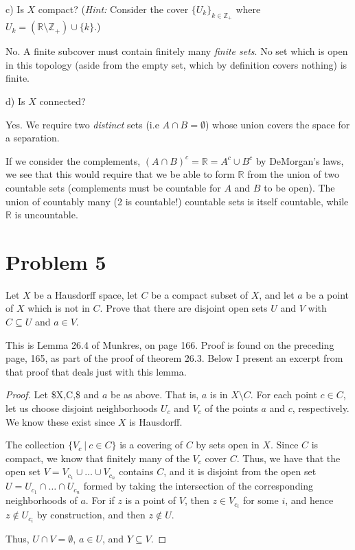 \documentclass[11pt]{article}
\begin{document}
c) Is \(X\) compact? (\textit{Hint:} Consider the cover
\(\{U_k\}_{k\in\mathbb{Z}_+}\) where \(U_k =
(\mathbb{R}\setminus\mathbb{Z}_+)\cup\{k\}\).)

No. A finite subcover must contain finitely many \textit{finite sets}. No set
which is open in this topology (aside from the empty set, which by definition
covers nothing) is finite.

d) Is \(X\) connected? 

Yes. We require two \textit{distinct} sets (i.e \(A\cap B = \emptyset\)) whose
union covers the space for a separation. 

If we consider the complements, \((A\cap B)^c = \mathbb{R} = A^c\cup B^c\) by
DeMorgan's laws, we see that this would require that we be able to form
\(\mathbb{R}\) from the union of two countable sets (complements must be countable
for \(A\) and \(B\) to be open). The union of countably many (2 is countable!)
countable sets is itself countable, while \(\mathbb{R}\) is uncountable.


\section{Problem 5}
\label{sec:org4670bbe}

Let \(X\) be a Hausdorff space, let \(C\) be a compact subset of \(X\), and let \(a\) be
a point of \(X\) which is not in \(C\). Prove that there are disjoint open sets \(U\)
and \(V\) with \(C\subseteq U\) and \(a\in V\).

This is Lemma 26.4 of Munkres, on page 166. Proof is found on the preceding
page, 165, as part of the proof of theorem 26.3. Below I present an excerpt from
that proof that deals just with this lemma. 

\begin{proof}
Let \$X,C,\$ and \(a\) be as above. That is, \(a\) is in \(X\setminus C\). For each
point \(c\in C\), let us choose disjoint neighborhoods \(U_c\) and \(V_c\) of the
points \(a\) and \(c\), respectively. We know these exist since \(X\) is Hausdorff. 

The collection \(\{V_c\ |\ c\in C\}\) is a covering of \(C\) by sets open in \(X\).
Since \(C\) is compact, we know that finitely many of the \(V_c\) cover \(C\). Thus,
we have that the open set \(V = V_{c_1}\cup \ldots \cup V_{c_n}\) contains \(C\),
and it is disjoint from the open set \(U = U_{c_1}\cap \ldots \cap U_{c_n}\)
formed by taking the intersection of the corresponding neighborhoods of \(a\).
For if \(z\) is a point of \(V\), then \(z\in V_{c_i}\) for some \(i\), and hence
\(z\not\in U_{c_i}\) by construction, and then \(z\not\in U\). 

Thus, \(U\cap V = \emptyset\), \(a\in U\), and \(Y\subseteq V\). 
\end{proof}
\end{document}
